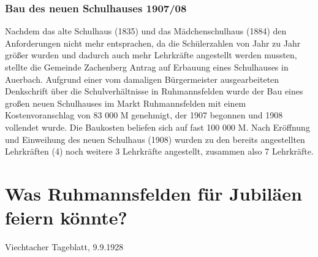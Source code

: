 \documentclass[12pt,a4paper]{book}
\begin{document}
\subsection[Bau des neuen Schulhauses 1907/08]{Bau des neuen Schulhauses
1907/08\protect\footnotemark{}\protect{}}

Nachdem das alte Schulhaus (1835) und das Mädchenschulhaus (1884) den
Anforderungen nicht mehr entsprachen, da die Schülerzahlen von Jahr zu
Jahr größer wurden und dadurch auch mehr Lehrkräfte angestellt werden
mussten, stellte die Gemeinde Zachenberg Antrag auf Erbauung eines
Schulhauses in Auerbach. Aufgrund einer vom damaligen Bürgermeister
ausgearbeiteten Denkschrift über die Schulverhältnisse in Ruhmannsfelden
wurde der Bau eines großen neuen Schulhauses im Markt Ruhmannsfelden mit
einem Kostenvoranschlag von 83 000 M genehmigt, der 1907 begonnen und
1908 vollendet wurde. Die Baukosten beliefen sich auf fast 100 000 M.
Nach Eröffnung und Einweihung des neuen Schulhaus (1908) wurden zu den
bereits angestellten Lehrkräften (4) noch weitere 3 Lehrkräfte
angestellt, zusammen also 7 Lehrkräfte.

\chapter{Was Ruhmannsfelden für Jubiläen feiern könnte?}

Viechtacher Tageblatt, 9.9.1928
\end{document}
